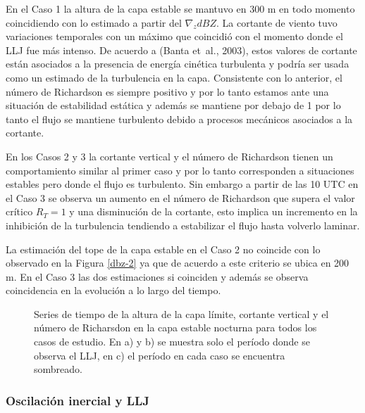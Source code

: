 \documentclass[12pt,spanish,oneside, a4paper]{book}
\begin{document}
En el Caso 1 la altura de la capa estable se mantuvo en 300 m en todo
momento coincidiendo con lo estimado a partir del \(\nabla_z dBZ\). La
cortante de viento tuvo variaciones temporales con un máximo que
coincidió con el momento donde el LLJ fue más intenso. De acuerdo a
(Banta et~al., 2003), estos valores de cortante están asociados a la
presencia de energía cinética turbulenta y podría ser usada como un
estimado de la turbulencia en la capa. Consistente con lo anterior, el
número de Richardson es siempre positivo y por lo tanto estamos ante una
situación de estabilidad estática y además se mantiene por debajo de 1
por lo tanto el flujo se mantiene turbulento debido a procesos mecánicos
asociados a la cortante.

En los Casos 2 y 3 la cortante vertical y el número de Richardson tienen
un comportamiento similar al primer caso y por lo tanto corresponden a
situaciones estables pero donde el flujo es turbulento. Sin embargo a
partir de las 10 UTC en el Caso 3 se observa un aumento en el número de
Richardson que supera el valor crítico \(R_T = 1\) y una disminución de
la cortante, esto implica un incremento en la inhibición de la
turbulencia tendiendo a estabilizar el flujo hasta volverlo laminar.

La estimación del tope de la capa estable en el Caso 2 no coincide con
lo observado en la Figura \ref{dbz-2} ya que de acuerdo a este criterio
se ubica en 200 m. En el Caso 3 las dos estimaciones si coinciden y
además se observa coincidencia en la evolución a lo largo del tiempo.

\begin{figure}
\newline{}\newline{}\caption{Series de tiempo de la altura de la capa límite, cortante vertical y el número de Richarsdon en la capa estable nocturna para todos los casos de estudio. En a) y b) se muestra solo el período donde se observa el LLJ, en c) el período en cada caso se encuentra sombreado. \label{estable-vad}}\label{fig:estable-vad}
\end{figure}

\subsubsection{Oscilación inercial y
LLJ}\label{oscilacion-inercial-y-llj}
\end{document}
